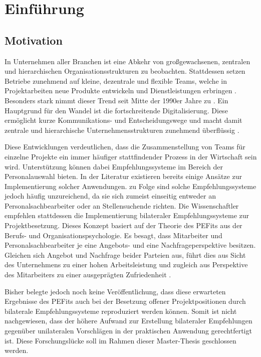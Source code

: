 \chapter{Einführung}
\label{ch:intro}

\section{Motivation}
\label{sec:intro:motivation}
In Unternehmen aller Branchen ist eine Abkehr von großgewachsenen, zentralen und hierarchischen Organisationsstrukturen zu beobachten. Stattdessen setzen Betriebe zunehmend auf kleine, dezentrale und flexible Teams, welche in Projektarbeiten neue Produkte entwickeln und Dienstleistungen erbringen \cite[S. 3]{elanceEconomy:1999}. Besonders stark nimmt dieser Trend seit Mitte der 1990er Jahre zu \cite[S. 8]{whittington:1999}. Ein Hauptgrund für den Wandel ist die fortschreitende Digitalisierung. Diese ermöglicht kurze Kommunikations- und Entscheidungswege und macht damit zentrale und hierarchische Unternehmensstrukturen zunehmend überflüssig \cite[S. 5]{elanceEconomy:1999}.

Diese Entwicklungen verdeutlichen, dass die Zusammenstellung von Teams für einzelne Projekte ein immer häufiger stattfindender Prozess in der Wirtschaft sein wird. Unterstützung können dabei Empfehlungssysteme im Bereich der Personalauswahl bieten. In der Literatur existieren bereits einige Ansätze zur Implementierung solcher Anwendungen. \textcite[S. 1ff.]{malinowski:2006} zu Folge sind solche Empfehlungssysteme jedoch häufig unzureichend, da sie sich zumeist einseitig entweder an Personalsachbearbeiter oder an Stellensuchende richten. Die Wissenschaftler empfehlen stattdessen die Implementierung bilateraler Empfehlungssysteme zur Projektbesetzung. Dieses Konzept basiert auf der Theorie des \acp{PEFit} aus der Berufs- und Organisationspsychologie. Es besagt, dass Mitarbeiter und Personalsachbearbeiter je eine Angebots- und eine Nachfrageperspektive besitzen. Gleichen sich Angebot und Nachfrage beider Parteien aus, führt dies aus Sicht des Unternehmens zu einer hohen Arbeitsleistung und zugleich aus Perspektive des Mitarbeiters zu einer ausgeprägten Zufriedenheit \cite[S. 6]{su:2015}.

Bisher belegte jedoch noch keine Veröffentlichung, dass diese erwarteten Ergebnisse des \acp{PEFit} auch bei der Besetzung offener Projektpositionen durch bilaterale Empfehlungssysteme reproduziert werden können. Somit ist nicht nachgewiesen, dass der höhere Aufwand zur Erstellung bilateraler Empfehlungen gegenüber unilateralen Vorschlägen in der praktischen Anwendung gerechtfertigt ist. Diese Forschungslücke soll im Rahmen dieser Master-Thesis geschlossen werden.

